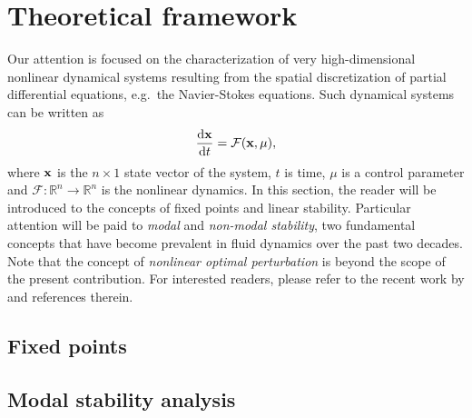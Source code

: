 \section{Theoretical framework}
\label{sec: theory}

  Our attention is focused on the characterization of very high-dimensional nonlinear dynamical systems resulting from the spatial discretization of partial differential equations, e.g.\ the Navier-Stokes equations. Such dynamical systems can be written as
  \begin{equation}
    \displaystyle \frac{\mathrm{d} {\bf x}}{\mathrm{d}t} = \mathcal{F}({\bf x}, \mu),
  \end{equation}
where ${\bf x}$ is the $n \times 1$ state vector of the system, $t$ is time, $\mu$ is a control parameter and $\mathcal{F} : \mathbb{R}^n \to \mathbb{R}^n $ is the nonlinear dynamics. In this section, the reader will be introduced to the concepts of fixed points and linear stability. Particular attention will be paid to \emph{modal} and \emph{non-modal stability}, two fundamental concepts that have become prevalent in fluid dynamics over the past two decades. Note that the concept of \emph{nonlinear optimal perturbation} is beyond the scope of the present contribution. For interested readers, please refer to the recent work by \cite{???} and references therein.



  \subsection{Fixed points}
  \label{subsec: theory-fixed points}






  \subsection{Modal stability analysis}
  \label{subsec: theory-modal stability}





